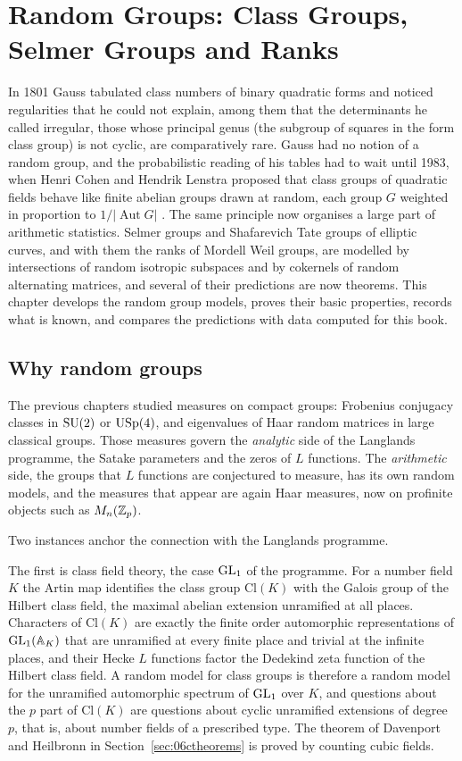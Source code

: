 \chapter{Random Groups: Class Groups, Selmer Groups and Ranks}\label{ch:06c}

In 1801 Gauss tabulated class numbers of binary quadratic forms and noticed regularities that he could not explain, among them that the determinants he called irregular, those whose principal genus (the subgroup of squares in the form class group) is not cyclic, are comparatively rare. Gauss had no notion of a random group, and the probabilistic reading of his tables had to wait until 1983, when Henri Cohen and Hendrik Lenstra proposed that class groups of quadratic fields behave like finite abelian groups drawn at random, each group $G$ weighted in proportion to $1/|\operatorname{Aut}G|$ \cite{cohenlenstra1984}. The same principle now organises a large part of arithmetic statistics. Selmer groups and Shafarevich Tate groups of elliptic curves, and with them the ranks of Mordell Weil groups, are modelled by intersections of random isotropic subspaces and by cokernels of random alternating matrices, and several of their predictions are now theorems. This chapter develops the random group models, proves their basic properties, records what is known, and compares the predictions with data computed for this book.

\section{Why random groups}\label{sec:06cwhy}

The previous chapters studied measures on compact groups: Frobenius conjugacy classes in $\mathrm{SU}(2)$ or $\mathrm{USp}(4)$, and eigenvalues of Haar random matrices in large classical groups. Those measures govern the \emph{analytic} side of the Langlands programme, the Satake parameters and the zeros of $L$ functions. The \emph{arithmetic} side, the groups that $L$ functions are conjectured to measure, has its own random models, and the measures that appear are again Haar measures, now on profinite objects such as $M_n(\mathbb{Z}_p)$.

Two instances anchor the connection with the Langlands programme.

The first is class field theory, the case $\mathrm{GL}_1$ of the programme. For a number field $K$ the Artin map identifies the class group $\mathrm{Cl}(K)$ with the Galois group of the Hilbert class field, the maximal abelian extension unramified at all places. Characters of $\mathrm{Cl}(K)$ are exactly the finite order automorphic representations of $\mathrm{GL}_1(\mathbb{A}_K)$ that are unramified at every finite place and trivial at the infinite places, and their Hecke $L$ functions factor the Dedekind zeta function of the Hilbert class field. A random model for class groups is therefore a random model for the unramified automorphic spectrum of $\mathrm{GL}_1$ over $K$, and questions about the $p$ part of $\mathrm{Cl}(K)$ are questions about cyclic unramified extensions of degree $p$, that is, about number fields of a prescribed type. The theorem of Davenport and Heilbronn in Section~\ref{sec:06ctheorems} is proved by counting cubic fields.

